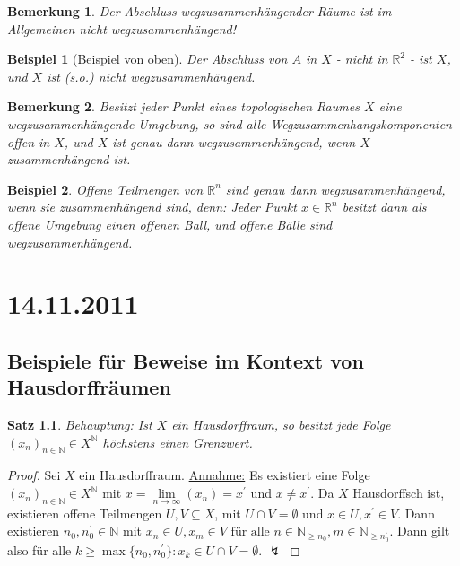 \documentclass[a4paper,11pt,notitlepage]{report}
\newtheorem{theorem}{Satz}[chapter]
\newtheorem{remark}{Bemerkung}[chapter]
\newtheorem{example}{Beispiel}[chapter]
\newcommand{\R}{{\ensuremath{\mathbb{R}}}}
\newcommand{\N}{{\ensuremath{\mathbb{N}}}}
\begin{document}
\begin{remark}
	Der Abschluss wegzusammenhängender Räume ist im Allgemeinen nicht wegzusammenhängend!
\end{remark}

\begin{example}[Beispiel von oben]
	Der Abschluss von $A$ \underline{in $X$} - nicht in $\R^2$ - ist $X$, und $X$ ist (s.o.) nicht wegzusammenhängend.
\end{example}

\begin{remark}
	Besitzt jeder Punkt eines topologischen Raumes $X$ eine wegzusammenhängende Umgebung, so sind alle Wegzusammenhangskomponenten offen in $X$, und $X$ ist genau dann wegzusammenhängend, wenn $X$ zusammenhängend ist.
\end{remark}

\begin{example}
	Offene Teilmengen von $\R^n$ sind genau dann wegzusammenhängend, wenn sie zusammenhängend sind, \underline{denn:}
	\newline
	Jeder Punkt $x \in \R^n$ besitzt dann als offene Umgebung einen offenen Ball, und offene Bälle sind wegzusammenhängend.
\end{example}

\chapter{14.11.2011}
\section{Beispiele für Beweise im Kontext von Hausdorffräumen}
\begin{theorem}{Behauptung:}
Ist $X$ ein Hausdorffraum, so besitzt jede Folge $(x_n)_{n \in \N} \in X^\N$ höchstens einen Grenzwert.
\end{theorem}
\begin{proof}
	Sei $X$ ein Hausdorffraum.
	\newline
	\underline{Annahme:} Es existiert eine Folge $(x_n)_{n \in \N} \in X^\N$ mit $x = \lim\limits_{n \rightarrow \infty}(x_n) = x^\prime$ und $x \neq x^\prime$.
	\newline
	Da $X$ Hausdorffsch ist, existieren offene Teilmengen $U,V \subseteq X$, mit $U \cap V = \emptyset$ und $x \in U, x^\prime \in V$. Dann existieren $n_0, n_0^\prime \in \N$ mit $x_n \in U, x_m \in V \text{ für alle } n \in \N_{\geq n_0}, m \in \N_{\geq n_0^\prime}$. Dann gilt also für alle $k \geq \max\{n_0,n_0^\prime\} \colon x_k \in U \cap V=\emptyset$. $\lightning$
\end{proof}
\end{document}
